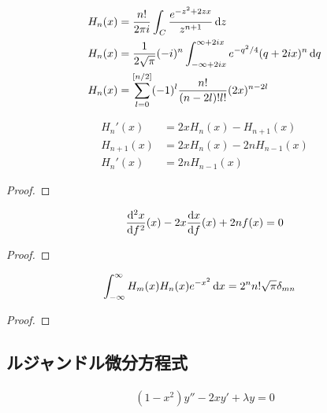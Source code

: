 \documentclass[uplatex,diffipdfmx,a4paper,11pt]{jlreq}
\begin{document}
\begin{proposition}
  \begin{align}
    H_n(x) & = \frac{n!}{2\pi i}\int_C\frac{e^{-z^2 + 2zx}}{z^{n+1}}\dl{z}                               \\
    H_n(x) & = \frac{1}{2\sqrt{\pi}}(-i)^n\int_{-\infty + 2ix}^{\infty + 2ix}e^{-q^2/4}(q + 2ix)^n\dl{q} \\
    H_n(x) & = \sum_{l=0}^{[n/2]}(-1)^l\frac{n!}{(n - 2l)!l!}(2x)^{n - 2l}
  \end{align}
\end{proposition}

\begin{proposition}
  \begin{align}
    H_n'(x)    & = 2xH_n(x) - H_{n+1}(x)   \\
    H_{n+1}(x) & = 2xH_n(x) - 2nH_{n-1}(x) \\
    H_n'(x)    & = 2nH_{n-1}(x)
  \end{align}
\end{proposition}
\begin{proof}

\end{proof}

\begin{theorem}
  \begin{align}
    \diff[2]{x}f(x) - 2x\diff{x}f(x) + 2nf(x) = 0
  \end{align}
\end{theorem}
\begin{proof}

\end{proof}

\begin{theorem}
  \begin{align}
    \int_{-\infty}^\infty H_m(x)H_n(x)e^{-x^2}\dl{x} & = 2^nn!\sqrt{\pi}\delta_{mn}
  \end{align}
\end{theorem}
\begin{proof}

\end{proof}


\subsection{ルジャンドル微分方程式}
\begin{definition}[ルジャンドル微分方程式]
  \begin{align}
    (1 - x^2)y'' - 2xy' + \lambda y = 0
  \end{align}
\end{definition}
\end{document}
